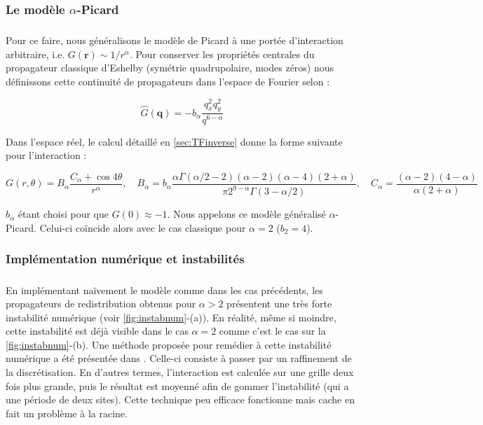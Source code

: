 \subsubsection{Le modèle $\alpha$-Picard}

\subparagraph{}Pour ce faire, nous généralisons le modèle de Picard à une portée d'interaction arbitraire, i.e. $G(\mathbf{r})\sim 1/r^\alpha$. Pour conserver les propriétés centrales du propagateur classique d'Eshelby (symétrie quadrupolaire, modes zéros) nous définissons cette continuité de propagateurs dans l'espace de Fourier selon :

\begin{equation}
	\hat{G}(\mathbf{q}) = -b_\alpha \frac{q_x^2 q_y^2}{q^{6-\alpha}}
\end{equation}

\noindent Dans l'espace réel, le calcul détaillé en \autoref{sec:TFinverse} donne la forme suivante pour l'interaction :

\begin{equation}
    G(r, \theta) = B_\alpha\frac{C_\alpha+\cos 4\theta}{r^\alpha}, \quad B_\alpha = b_\alpha\frac{\alpha\Gamma(\alpha/2-2)(\alpha-2)(\alpha-4)(2+\alpha)}{\pi 2^{9-\alpha}\Gamma(3-\alpha/2)},\quad C_\alpha = \frac{(\alpha-2)(4-\alpha)}{\alpha (2+\alpha)}
    \label{eq:RealAlphaPicard}
\end{equation}

\noindent $b_\alpha$ étant choisi pour que $G(0)\approx-1$. Nous appelons ce modèle généralisé $\alpha$-Picard. Celui-ci coïncide alors avec le cas classique pour $\alpha=2$ ($b_2 = 4$).

\subsubsection{Implémentation numérique et instabilités}

\subparagraph{}En implémentant naïvement le modèle comme dans les cas précédents, les propagateurs de redistribution obtenus pour $\alpha>2$ présentent une très forte instabilité numérique (voir \autoref{fig:instabnum}-(a)). En réalité, même si moindre, cette instabilité est déjà visible dans le cas $\alpha=2$ comme c'est le cas sur la \autoref{fig:instabnum}-(b). Une méthode proposée pour remédier à cette instabilité numérique a été présentée dans \cite{nicolas_ecoulements_2014}. Celle-ci consiste à passer par un raffinement de la discrétisation. En d'autres termes, l'interaction est calculée sur une grille deux fois plus grande, puis le résultat est moyenné afin de gommer l'instabilité (qui a une période de deux sites). Cette technique peu efficace fonctionne mais cache en fait un problème à la racine. 

